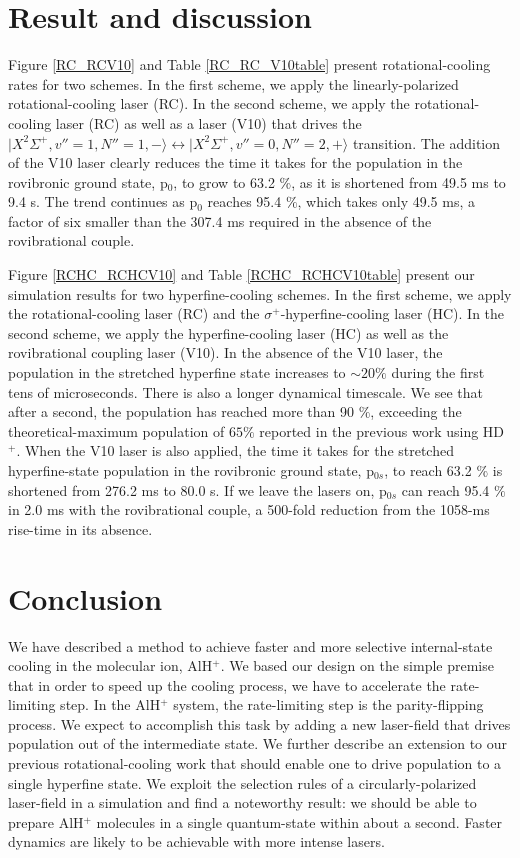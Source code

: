 \documentclass[nofootinbib,aip,jcp,reprint]{revtex4-1}
\begin{document}
\section{Result and discussion}
Figure \ref{RC_RCV10} and Table \ref{RC_RC_V10table} present rotational-cooling rates for two schemes. In the first scheme, we apply the linearly-polarized rotational-cooling laser (RC). In the second scheme, we apply the rotational-cooling laser (RC) as well as a laser (V10) that drives the $\lvert X^2\Sigma^+, v''=1, N''=1, -\rangle \leftrightarrow \lvert X^2\Sigma^+, v''=0, N''=2, +\rangle$ transition. The addition of the V10 laser clearly reduces the time it takes for the population in the rovibronic ground state, p$_0$, to grow to 63.2 $\%$, as it is shortened from 49.5 ms to 9.4 {\micro}s. The trend continues as p$_0$ reaches 95.4 $\%$, which takes only 49.5 ms, a factor of six smaller than the 307.4 ms required in the absence of the rovibrational couple.

Figure \ref{RCHC_RCHCV10} and Table \ref{RCHC_RCHCV10table} present our simulation results for two hyperfine-cooling schemes. In the first scheme, we apply the rotational-cooling laser (RC) and the $\sigma^+$-hyperfine-cooling laser (HC). In the second scheme, we apply the hyperfine-cooling laser (HC) as well as the rovibrational coupling laser (V10). In the absence of the V10 laser, the population in the stretched hyperfine state increases to $\sim 20 \%$ during the first tens of microseconds. There is also a longer dynamical timescale. We see that after a second, the population has reached more than 90 $\%$, exceeding the theoretical-maximum population of $65 \%$ reported in the previous work using HD$^+$\cite{bressel2012manipulation}. When the V10 laser is also applied, the time it takes for the stretched hyperfine-state population in the rovibronic ground state, p$_{0s}$, to reach 63.2 $\%$ is shortened from 276.2 ms to 80.0 {\micro}s. If we leave the lasers on, p$_{0s}$ can reach 95.4 $\%$ in 2.0 ms with the rovibrational couple, a 500-fold reduction from the 1058-ms rise-time in its absence.

\section{Conclusion}
We have described a method to achieve faster and more selective internal-state cooling in the molecular ion, AlH$^+$. We based our design on the simple premise that in order to speed up the cooling process, we have to accelerate the rate-limiting step. In the AlH$^+$ system, the rate-limiting step is the parity-flipping process. We expect to accomplish this task by adding a new laser-field that drives population out of the intermediate state. We further describe an extension to our previous rotational-cooling work that should enable one to drive population to a single hyperfine state. We exploit the selection rules of a circularly-polarized laser-field in a simulation and find a noteworthy result: we should be able to prepare AlH$^+$ molecules in a single quantum-state within about a second. Faster dynamics are likely to be achievable with more intense lasers.



\end{document}
